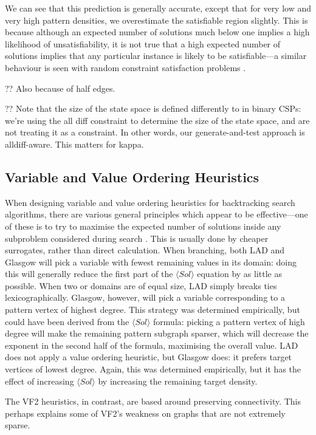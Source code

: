 \documentclass[letterpaper]{article}
\begin{document}
We can see that this prediction is generally accurate, except that for very low and very high
pattern densities, we overestimate the satisfiable region slightly. This is because although an
expected number of solutions much below one implies a high likelihood of unsatisfiability, it is not
true that a high expected number of solutions implies that any particular instance is likely to be
satisfiable---a similar behaviour is seen with random constraint satisfaction problems
\citep{Smith:1994,Smith:1996}.

?? Also because of half edges.

?? Note that the size of the state space is defined differently to in binary CSPs: we're using the
all diff constraint to determine the size of the state space, and are not treating it as a
constraint. In other words, our generate-and-test approach is alldiff-aware. This matters for kappa.

\subsection{Variable and Value Ordering Heuristics}

When designing variable and value ordering heuristics for backtracking search algorithms, there are
various general principles which appear to be effective---one of these is to try to maximise the
expected number of solutions inside any subproblem considered during search \citep{Gent:1996:EN}.
This is usually done by cheaper surrogates, rather than direct calculation. When branching, both LAD
and Glasgow will pick a variable with fewest remaining values in its domain: doing this will
generally reduce the first part of the $\langle Sol \rangle$ equation by as little as possible. When
two or domains are of equal size, LAD simply breaks ties lexicographically. Glasgow, however, will
pick a variable corresponding to a pattern vertex of highest degree. This strategy was determined
empirically, but could have been derived from the $\langle Sol \rangle$ formula: picking a
pattern vertex of high degree will make the remaining pattern subgraph sparser, which will decrease
the exponent in the second half of the formula, maximising the overall value. LAD does not apply a
value ordering heuristic, but Glasgow does: it prefers target vertices of lowest degree. Again, this
was determined empirically, but it has the effect of increasing $\langle Sol \rangle$ by increasing
the remaining target density.

The VF2 heuristics, in contrast, are based around preserving connectivity. This perhaps explains
some of VF2's weakness on graphs that are not extremely sparse.
\end{document}

